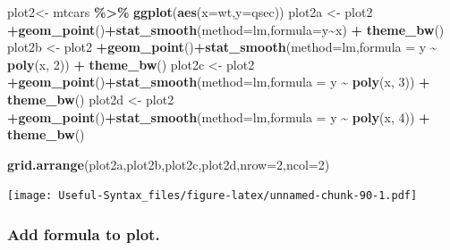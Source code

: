 \documentclass[
]{article}
\newenvironment{Shaded}{\begin{snugshade}}{\end{snugshade}}
\newcommand{\AttributeTok}[1]{\textcolor[rgb]{0.13,0.29,0.53}{#1}}
\newcommand{\DecValTok}[1]{\textcolor[rgb]{0.00,0.00,0.81}{#1}}
\newcommand{\FunctionTok}[1]{\textcolor[rgb]{0.13,0.29,0.53}{\textbf{#1}}}
\newcommand{\NormalTok}[1]{#1}
\newcommand{\OtherTok}[1]{\textcolor[rgb]{0.56,0.35,0.01}{#1}}
\newcommand{\SpecialCharTok}[1]{\textcolor[rgb]{0.81,0.36,0.00}{\textbf{#1}}}
\newcommand{\StringTok}[1]{\textcolor[rgb]{0.31,0.60,0.02}{#1}}
\begin{document}
\begin{Shaded}
\begin{Highlighting}[]
\NormalTok{plot2}\OtherTok{\textless{}{-}}\NormalTok{ mtcars }\SpecialCharTok{\%\textgreater{}\%} \FunctionTok{ggplot}\NormalTok{(}\FunctionTok{aes}\NormalTok{(}\AttributeTok{x=}\NormalTok{wt,}\AttributeTok{y=}\NormalTok{qsec))}
\NormalTok{plot2a }\OtherTok{\textless{}{-}}\NormalTok{ plot2 }\SpecialCharTok{+}\FunctionTok{geom\_point}\NormalTok{()}\SpecialCharTok{+}\FunctionTok{stat\_smooth}\NormalTok{(}\AttributeTok{method=}\StringTok{\textquotesingle{}lm\textquotesingle{}}\NormalTok{,}\AttributeTok{formula=}\NormalTok{y}\SpecialCharTok{\textasciitilde{}}\NormalTok{x) }\SpecialCharTok{+} \FunctionTok{theme\_bw}\NormalTok{()}
\NormalTok{plot2b }\OtherTok{\textless{}{-}}\NormalTok{ plot2 }\SpecialCharTok{+}\FunctionTok{geom\_point}\NormalTok{()}\SpecialCharTok{+}\FunctionTok{stat\_smooth}\NormalTok{(}\AttributeTok{method=}\StringTok{\textquotesingle{}lm\textquotesingle{}}\NormalTok{,}\AttributeTok{formula =}\NormalTok{ y }\SpecialCharTok{\textasciitilde{}} \FunctionTok{poly}\NormalTok{(x, }\DecValTok{2}\NormalTok{)) }\SpecialCharTok{+} \FunctionTok{theme\_bw}\NormalTok{()}
\NormalTok{plot2c }\OtherTok{\textless{}{-}}\NormalTok{ plot2 }\SpecialCharTok{+}\FunctionTok{geom\_point}\NormalTok{()}\SpecialCharTok{+}\FunctionTok{stat\_smooth}\NormalTok{(}\AttributeTok{method=}\StringTok{\textquotesingle{}lm\textquotesingle{}}\NormalTok{,}\AttributeTok{formula =}\NormalTok{ y }\SpecialCharTok{\textasciitilde{}} \FunctionTok{poly}\NormalTok{(x, }\DecValTok{3}\NormalTok{)) }\SpecialCharTok{+} \FunctionTok{theme\_bw}\NormalTok{()}
\NormalTok{plot2d }\OtherTok{\textless{}{-}}\NormalTok{ plot2 }\SpecialCharTok{+}\FunctionTok{geom\_point}\NormalTok{()}\SpecialCharTok{+}\FunctionTok{stat\_smooth}\NormalTok{(}\AttributeTok{method=}\StringTok{\textquotesingle{}lm\textquotesingle{}}\NormalTok{,}\AttributeTok{formula =}\NormalTok{ y }\SpecialCharTok{\textasciitilde{}} \FunctionTok{poly}\NormalTok{(x, }\DecValTok{4}\NormalTok{)) }\SpecialCharTok{+} \FunctionTok{theme\_bw}\NormalTok{()}

\FunctionTok{grid.arrange}\NormalTok{(plot2a,plot2b,plot2c,plot2d,}\AttributeTok{nrow=}\DecValTok{2}\NormalTok{,}\AttributeTok{ncol=}\DecValTok{2}\NormalTok{)}
\end{Highlighting}
\end{Shaded}

\texttt{[image: Useful-Syntax\_files/figure-latex/unnamed-chunk-90-1.pdf]}

\hypertarget{add-formula-to-plot.}{%
\subsubsection{Add formula to plot.}\label{add-formula-to-plot.}}
\end{document}
